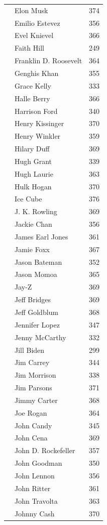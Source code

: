 \documentclass{article}
\begin{document}
{\begin{longtable}{p{}p{}r}
 & Elon Musk & 374 \\
 & Emilio Estevez & 356 \\
 & Evel Knievel & 366 \\
 & Faith Hill & 249 \\
 & Franklin D. Roosevelt & 364 \\
 & Genghis Khan & 355 \\
 & Grace Kelly & 333 \\
 & Halle Berry & 366 \\
 & Harrison Ford & 340 \\
 & Henry Kissinger & 370 \\
 & Henry Winkler & 359 \\
 & Hilary Duff & 369 \\
 & Hugh Grant & 339 \\
 & Hugh Laurie & 363 \\
 & Hulk Hogan & 370 \\
 & Ice Cube & 376 \\
 & J. K. Rowling & 369 \\
 & Jackie Chan & 356 \\
 & James Earl Jones & 361 \\
 & Jamie Foxx & 367 \\
 & Jason Bateman & 352 \\
 & Jason Momoa & 365 \\
 & Jay-Z & 369 \\
 & Jeff Bridges & 369 \\
 & Jeff Goldblum & 368 \\
 & Jennifer Lopez & 347 \\
 & Jenny McCarthy & 332 \\
 & Jill Biden & 299 \\
 & Jim Carrey & 344 \\
 & Jim Morrison & 338 \\
 & Jim Parsons & 371 \\
 & Jimmy Carter & 368 \\
 & Joe Rogan & 364 \\
 & John Candy & 345 \\
 & John Cena & 369 \\
 & John D. Rockefeller & 357 \\
 & John Goodman & 350 \\
 & John Lennon & 356 \\
 & John Ritter & 361 \\
 & John Travolta & 363 \\
 & Johnny Cash & 370 \\

\end{longtable}}
\end{document}
